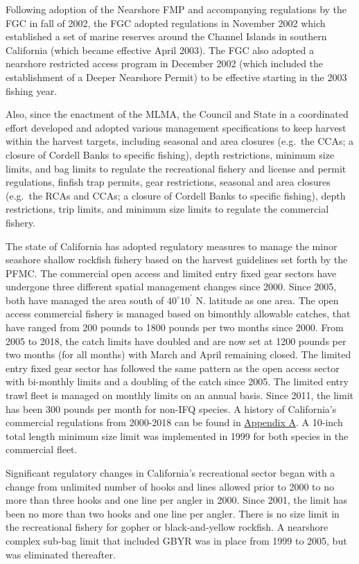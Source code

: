 \documentclass[12pt,]{article}
\begin{document}
Following adoption of the Nearshore FMP and accompanying regulations by
the FGC in fall of 2002, the FGC adopted regulations in November 2002
which established a set of marine reserves around the Channel Islands in
southern California (which became effective April 2003). The FGC also
adopted a nearshore restricted access program in December 2002 (which
included the establishment of a Deeper Nearshore Permit) to be effective
starting in the 2003 fishing year.

Also, since the enactment of the MLMA, the Council and State in a
coordinated effort developed and adopted various management
specifications to keep harvest within the harvest targets, including
seasonal and area closures (e.g.~the CCAs; a closure of Cordell Banks to
specific fishing), depth restrictions, minimum size limits, and bag
limits to regulate the recreational fishery and license and permit
regulations, finfish trap permits, gear restrictions, seasonal and area
closures (e.g.~the RCAs and CCAs; a closure of Cordell Banks to specific
fishing), depth restrictions, trip limits, and minimum size limits to
regulate the commercial fishery.

The state of California has adopted regulatory measures to manage the
minor seashore shallow rockfish fishery based on the harvest guidelines
set forth by the PFMC. The commercial open access and limited entry
fixed gear sectors have undergone three different spatial management
changes since 2000. Since 2005, both have managed the area south of
\(40^\circ 10^\prime\) N. latitude as one area. The open access
commercial fishery is managed based on bimonthly allowable catches, that
have ranged from 200 pounds to 1800 pounds per two months since 2000.
From 2005 to 2018, the catch limits have doubled and are now set at 1200
pounds per two months (for all months) with March and April remaining
closed. The limited entry fixed gear sector has followed the same
pattern as the open access sector with bi-monthly limits and a doubling
of the catch since 2005. The limited entry trawl fleet is managed on
monthly limits on an annual basis. Since 2011, the limit has been 300
pounds per month for non-IFQ species. A history of California's
commercial regulations from 2000-2018 can be found in
\protect\hyperlink{appendix-a.-californias-commercial-fishery-regulations}{Appendix
A}. A 10-inch total length minimum size limit was implemented in 1999
for both species in the commercial fleet.

Significant regulatory changes in California's recreational sector began
with a change from unlimited number of hooks and lines allowed prior to
2000 to no more than three hooks and one line per angler in 2000. Since
2001, the limit has been no more than two hooks and one line per angler.
There is no size limit in the recreational fishery for gopher or
black-and-yellow rockfish. A nearshore complex sub-bag limit that
included GBYR was in place from 1999 to 2005, but was eliminated
thereafter.
\end{document}
